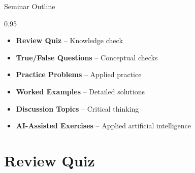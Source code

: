 \documentclass[9pt, aspectratio=169, t]{beamer}
\subtitle{Seminar 7: Cointegration and VECM}
\begin{document}
{
\begin{frame}
    \titlepage
\end{frame}
}


\begin{frame}{Seminar Outline}
    \begin{cminipage}{0.95\textwidth}
    \begin{itemize}
        \item \textbf{Review Quiz} -- Knowledge check
        \vspace{0.15cm}
        \item \textbf{True/False Questions} -- Conceptual checks
        \vspace{0.15cm}
        \item \textbf{Practice Problems} -- Applied practice
        \vspace{0.15cm}
        \item \textbf{Worked Examples} -- Detailed solutions
        \vspace{0.15cm}
        \item \textbf{Discussion Topics} -- Critical thinking
        \vspace{0.15cm}
        \item \textbf{AI-Assisted Exercises} -- Applied artificial intelligence
    \end{itemize}
    \end{cminipage}
\end{frame}

\section{Review Quiz}
\end{document}
